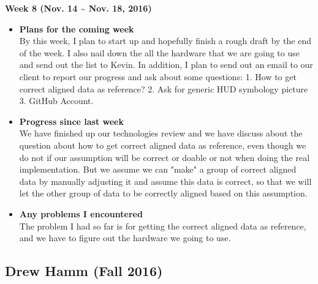 		\begin{center}
			\textbf{Week 8 (Nov. 14 {\textasciitilde{}} Nov. 18, 2016)}
		\end{center}
		\begin{itemize}
			\item \textbf{Plans for the coming week}
			\\By this week, I plan to start up and hopefully finish a rough draft by the end of the week. I also nail down the all the hardware that we are going to use and send out the list to Kevin. In addition, I plan to send out an email to our client to report our progress and ask about some questions: 1. How to get correct aligned data as reference? 2. Ask for generic HUD symbology picture 3. GitHub Account.\\

			\item \textbf{Progress since last week}
			\\We have finished up our technologies review and we have discuss about the question about how to get correct aligned data as reference, even though we do not if our assumption will be correct or doable or not when doing the real implementation. But we assume we can "make" a group of correct aligned data by manually adjusting it and assume this data is correct, so that we will let the other group of data to be correctly aligned based on this assumption.\\

			\item \textbf{Any problems I encountered}
			\\The problem I had so far is for getting the correct aligned data as reference, and we have to figure out the hardware we going to use.\\
		\end{itemize}



		\subsection{Drew Hamm (Fall 2016)}
		\vspace{0.5cm}

